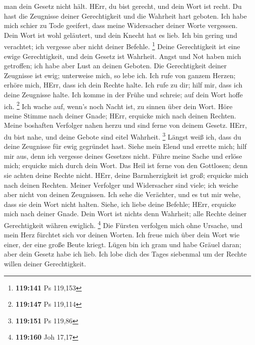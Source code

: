 man dein Gesetz nicht hält.  HErr, du bist gerecht, und
dein Wort ist recht.  Du hast die Zeugnisse deiner
Gerechtigkeit und die Wahrheit hart geboten.  Ich habe
mich schier zu Tode geeifert, dass meine Widersacher deiner Worte
vergessen.  Dein Wort ist wohl geläutert, und dein Knecht
hat es lieb.  Ich bin gering und verachtet; ich vergesse
aber nicht deiner Befehle. \footnote{\textbf{119:141} Ps 119,153}
 Deine Gerechtigkeit ist eine ewige Gerechtigkeit, und
dein Gesetz ist Wahrheit.  Angst und Not haben mich
getroffen; ich habe aber Lust an deinen Geboten.  Die
Gerechtigkeit deiner Zeugnisse ist ewig; unterweise mich, so lebe ich.
 Ich rufe von ganzem Herzen; erhöre mich, HErr, dass ich
dein Rechte halte.  Ich rufe zu dir; hilf mir, dass ich
deine Zeugnisse halte.  Ich komme in der Frühe und
schreie; auf dein Wort hoffe ich. \footnote{\textbf{119:147} Ps 119,114}
 Ich wache auf, wenn's noch Nacht ist, zu sinnen über dein
Wort.  Höre meine Stimme nach deiner Gnade; HErr, erquicke
mich nach deinen Rechten.  Meine boshaften Verfolger nahen
herzu und sind ferne von deinem Gesetz.  HErr, du bist
nahe, und deine Gebote sind eitel Wahrheit. \footnote{\textbf{119:151}
  Ps 119,86}  Längst weiß ich, dass du deine Zeugnisse für
ewig gegründet hast.  Siehe mein Elend und errette mich;
hilf mir aus, denn ich vergesse deines Gesetzes nicht. 
Führe meine Sache und erlöse mich; erquicke mich durch dein Wort.
 Das Heil ist ferne von den Gottlosen; denn sie achten
deine Rechte nicht.  HErr, deine Barmherzigkeit ist groß;
erquicke mich nach deinen Rechten.  Meiner Verfolger und
Widersacher sind viele; ich weiche aber nicht von deinen Zeugnissen.
 Ich sehe die Verächter, und es tut mir wehe, dass sie
dein Wort nicht halten.  Siehe, ich liebe deine Befehle;
HErr, erquicke mich nach deiner Gnade.  Dein Wort ist
nichts denn Wahrheit; alle Rechte deiner Gerechtigkeit währen ewiglich.
\footnote{\textbf{119:160} Joh 17,17}  Die Fürsten
verfolgen mich ohne Ursache, und mein Herz fürchtet sich vor deinen
Worten.  Ich freue mich über dein Wort wie einer, der eine
große Beute kriegt.  Lügen bin ich gram und habe Gräuel
daran; aber dein Gesetz habe ich lieb.  Ich lobe dich des
Tages siebenmal um der Rechte willen deiner Gerechtigkeit.
